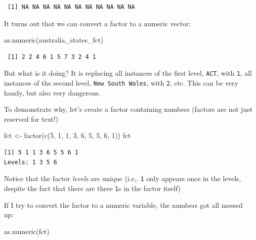 \documentclass[
  letterpaper,
  DIV=11,
  numbers=noendperiod]{scrreprt}
\newenvironment{Shaded}{\begin{snugshade}}{\end{snugshade}}
\newcommand{\DecValTok}[1]{\textcolor[rgb]{0.68,0.00,0.00}{#1}}
\newcommand{\FunctionTok}[1]{\textcolor[rgb]{0.28,0.35,0.67}{#1}}
\newcommand{\NormalTok}[1]{\textcolor[rgb]{0.00,0.23,0.31}{#1}}
\newcommand{\OtherTok}[1]{\textcolor[rgb]{0.00,0.23,0.31}{#1}}
\begin{document}
\begin{verbatim}
 [1] NA NA NA NA NA NA NA NA NA NA NA
\end{verbatim}

It turns out that we can convert a factor to a numeric vector:

\begin{Shaded}
\begin{Highlighting}[]
\FunctionTok{as.numeric}\NormalTok{(australia\_states\_fct)}
\end{Highlighting}
\end{Shaded}

\begin{verbatim}
 [1] 2 2 4 6 1 5 7 3 2 4 1
\end{verbatim}

But what is it doing? It is replacing all instances of the first level,
\texttt{ACT}, with \texttt{1}, all instances of the second level,
\texttt{New\ South\ Wales}, with \texttt{2}, etc. This can be very
handy, but also very dangerous.

To demonstrate why, let's create a factor containing numbers (factors
are not just reserved for text!)

\begin{Shaded}
\begin{Highlighting}[]
\NormalTok{fct }\OtherTok{\textless{}{-}} \FunctionTok{factor}\NormalTok{(}\FunctionTok{c}\NormalTok{(}\DecValTok{5}\NormalTok{, }\DecValTok{1}\NormalTok{, }\DecValTok{1}\NormalTok{, }\DecValTok{3}\NormalTok{, }\DecValTok{6}\NormalTok{, }\DecValTok{5}\NormalTok{, }\DecValTok{5}\NormalTok{, }\DecValTok{6}\NormalTok{, }\DecValTok{1}\NormalTok{))}
\NormalTok{fct}
\end{Highlighting}
\end{Shaded}

\begin{verbatim}
[1] 5 1 1 3 6 5 5 6 1
Levels: 1 3 5 6
\end{verbatim}

Notice that the factor \emph{levels} are unique (i.e,. \texttt{1} only
appears once in the levels, despite the fact that there are three
\texttt{1}s in the factor itself)

If I try to convert the factor to a numeric variable, the numbers got
all messed up:

\begin{Shaded}
\begin{Highlighting}[]
\FunctionTok{as.numeric}\NormalTok{(fct)}
\end{Highlighting}
\end{Shaded}
\end{document}
